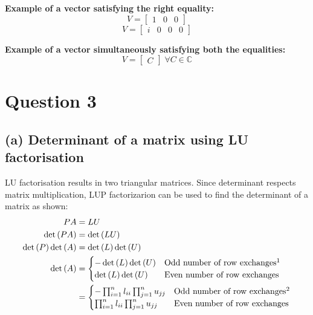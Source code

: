 \documentclass[11pt, oneside]{article}
\begin{document}
  \noindent\textbf{Example of a vector satisfying the right equality:} \begin{equation*}
    V = \begin{bmatrix}
      1 & 0 & 0
  \end{bmatrix}
  \end{equation*}
  \begin{equation*}
    V = \begin{bmatrix}
      i & 0 & 0 & 0
  \end{bmatrix}
  \end{equation*}

  \noindent\textbf{Example of a vector simultaneously satisfying both the equalities:} \begin{equation*}
    V = \begin{bmatrix}
      C
  \end{bmatrix} \; \forall C \in \mathbb{C}
  \end{equation*}
  \vfill

\section*{Question 3}
\subsection*{(a) Determinant of a matrix using LU factorisation}
  LU factorisation results in two triangular matrices. Since determinant respects matrix multiplication, LUP factorizarion can be used to find the determinant of a matrix as shown:
  \begin{align*}
    PA &= LU \\
    \det {(PA)} &= \det {(LU)} \\
    \det{(P)} \det{(A)} &= \det{(L)} \det{(U)} \\
    \det{(A)} &=  \begin{cases}
                - \det{(L)} \det{(U)} & \text{Odd number of row exchanges}\footnotemark \\
                \det{(L)} \det{(U)} & \text{Even number of row exchanges} \\
              \end{cases} \\
              &= \begin{cases}
                - \prod_{i=1}^n l_{ii} \prod_{j=1}^n u_{jj} & \text{Odd number of row exchanges}\footnotemark \\
                \prod_{i=1}^n l_{ii} \prod_{j=1}^n u_{jj} & \text{Even number of row exchanges} \\
              \end{cases}
  \end{align*}
  \addtocounter{footnote}{-1}
\end{document}

